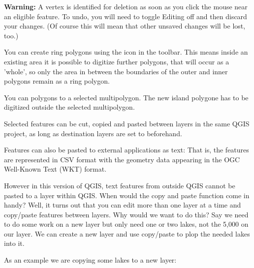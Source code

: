 \textbf{Warning:} A vertex is identified for deletion as
soon as you click the mouse near an eligible
feature.  To undo, you will need to toggle
Editing off and then discard your changes.
(Of course this will mean that other unsaved changes will be lost, too.)


You can create ring polygons using the 
icon in the toolbar. This means inside an existing area it is
possible to digitize further polygons, that will occur as a 'whole', so only 
the area in between the boundaries of the outer and inner polygons remain as 
a ring polygon. 


You can  polygons to a selected multipolygon. 
The new island polygone 
has to be digitized outside the selected multipolygon. 


Selected features can be cut, copied and pasted between layers in the
same QGIS project, as long as destination layers are set to 
 beforehand.

Features can also be pasted to external applications as text:  That is,
the features are represented in CSV format with the geometry data appearing 
in the OGC Well-Known Text (WKT) format.

However in this version of QGIS, text features from outside QGIS cannot 
be pasted to a layer within QGIS. When would the copy and paste function 
come in handy? Well, it turns out that you can edit more than one layer 
at a time and copy/paste features between layers. Why would we want to do 
this?  Say we need to do some work on a new layer but only need one or 
two lakes, not the 5,000 on our  layer. We can create 
a new layer and use copy/paste to plop the needed lakes into it. 

As an example we are copying some lakes to a new layer:

